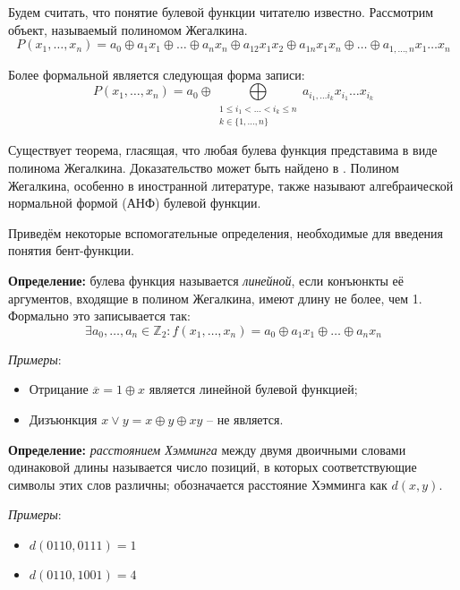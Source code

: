 \documentclass[12pt, a4paper, reqno]{article}
\begin{document}
    Будем считать, что понятие булевой функции читателю известно. Рассмотрим объект, называемый
    полиномом Жегалкина.
    \begin{equation*}
        P(x_1, \ldots, x_n) = a_0 \oplus a_1 x_1 \oplus \ldots \oplus a_n x_n \oplus a_{12} x_1 x_2
        \oplus a_{1n} x_1 x_n \oplus \ldots \oplus a_{1,\ldots,n} x_1 \ldots x_n
    \end{equation*}

    Более формальной является следующая форма записи:
    \begin{equation*}
        P(x_1, \ldots, x_n) = a_0 \oplus
        \bigoplus\limits_{\substack{1 \leq i_1 < \ldots < i_k \leq n \\ k \in \{1, \ldots, n\}}}
        a_{i_1, \ldots i_k} x_{i_1} \ldots x_{i_k}
    \end{equation*}

    Существует теорема, гласящая, что любая булева функция представима в виде полинома Жегалкина.
    Доказательство может быть найдено в \cite{rubtsov}. Полином Жегалкина, особенно в иностранной
    литературе, также называют алгебраической нормальной формой (АНФ) булевой функции.

    Приведём некоторые вспомогательные определения, необходимые для введения понятия бент-функции.

    \textbf{Определение:} булева функция называется \textit{линейной}, если конъюнкты её аргументов,
    входящие в полином Жегалкина, имеют длину не более, чем 1. Формально это записывается так:
    \begin{equation*}
        \exists a_0, \ldots, a_n \in \mathbb{Z}_2:
        f(x_1, \ldots, x_n) = a_0 \oplus a_1 x_1 \oplus \ldots \oplus a_n x_n
    \end{equation*}

    \textit{Примеры}:
    \begin{itemize}
        \item Отрицание $\overline{x} = 1 \oplus x$ является линейной булевой функцией;
        \item Дизъюнкция $x \vee y = x \oplus y \oplus xy$ -- не является.
    \end{itemize}

    \textbf{Определение:} \textit{расстоянием Хэмминга} между двумя двоичными словами одинаковой
    длины называется число позиций, в которых соответствующие символы этих слов различны;
    обозначается расстояние Хэмминга как $d(x, y)$.

    \textit{Примеры}:
    \begin{itemize}
        \item $d(0110, 0111) = 1$
        \item $d(0110, 1001) = 4$
    \end{itemize}
\end{document}
